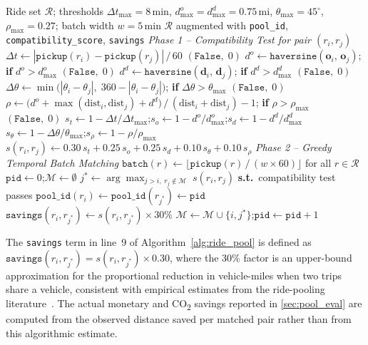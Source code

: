 \documentclass[a4paper,fleqn]{cas-dc}
\begin{document}
\begin{algorithm}[H]
\caption{Multi-Criteria Ride Pooling (Compatibility Test and Greedy Matching)}
\label{alg:ride_pool}
\begin{algorithmic}[1]
\Require Ride set $\mathcal{R}$; thresholds $\Delta t_{\max}{=}8$\,min, $d^o_{\max}{=}d^d_{\max}{=}0.75$\,mi, $\theta_{\max}{=}45^\circ$, $\rho_{\max}{=}0.27$; batch width $w{=}5$\,min
\Ensure $\mathcal{R}$ augmented with \texttt{pool\_id}, \texttt{compatibility\_score}, \texttt{savings}
\Statex \textit{Phase 1 -- Compatibility Test for pair $(r_i, r_j)$}
\State $\Delta t \gets |\texttt{pickup}(r_i) - \texttt{pickup}(r_j)|\,/\,60$
 \Return $(\mathtt{False},\;0)$ \EndIf
\State $d^o \gets \texttt{haversine}(\mathbf{o}_i,\,\mathbf{o}_j)$; \textbf{if} $d^o > d^o_{\max}$ \Return $(\mathtt{False},\;0)$
\State $d^d \gets \texttt{haversine}(\mathbf{d}_i,\,\mathbf{d}_j)$; \textbf{if} $d^d > d^d_{\max}$ \Return $(\mathtt{False},\;0)$
\State $\Delta\theta \gets \min\bigl(|\theta_i-\theta_j|,\;360-|\theta_i-\theta_j|\bigr)$; \textbf{if} $\Delta\theta > \theta_{\max}$ \Return $(\mathtt{False},\;0)$
\State $\rho \gets \bigl(d^o + \max(\mathrm{dist}_i, \mathrm{dist}_j) + d^d\bigr)\,/\,(\mathrm{dist}_i + \mathrm{dist}_j) - 1$; \textbf{if} $\rho > \rho_{\max}$ \Return $(\mathtt{False},\;0)$
\State $s_t \gets 1-\Delta t/\Delta t_{\max}$;\enspace $s_o \gets 1-d^o/d^o_{\max}$;\enspace $s_d \gets 1-d^d/d^d_{\max}$
\State $s_\theta \gets 1-\Delta\theta/\theta_{\max}$;\enspace $s_\rho \gets 1-\rho/\rho_{\max}$
\State $s(r_i,r_j) \gets 0.30\,s_t + 0.25\,s_o + 0.25\,s_d + 0.10\,s_\theta + 0.10\,s_\rho$
\Statex \textit{Phase 2 -- Greedy Temporal Batch Matching}
\State $\texttt{batch}(r) \gets \lfloor\texttt{pickup}(r)\,/\,(w\!\times\!60)\rfloor$ \; for all $r\in\mathcal{R}$
\State $\texttt{pid} \gets 0$;\quad $\mathcal{M} \gets \emptyset$
    \State $j^* \gets \arg\max_{j>i,\;r_j\notin\mathcal{M}}\;s(r_i,r_j)$ \textbf{s.t.}\ compatibility test passes
      \State $\texttt{pool\_id}(r_i)\gets\texttt{pool\_id}(r_{j^*})\gets\texttt{pid}$
      \State $\texttt{savings}(r_i,r_{j^*})\gets s(r_i,r_{j^*})\times 30\%$
      \State $\mathcal{M}\gets\mathcal{M}\cup\{i,j^*\}$;\quad $\texttt{pid}\gets\texttt{pid}+1$
    \EndIf
  \EndFor
\EndFor
\end{algorithmic}
\end{algorithm}

The \texttt{savings} term in line~9 of Algorithm~\ref{alg:ride_pool} is defined as $\texttt{savings}(r_i, r_{j^*}) = s(r_i, r_{j^*}) \times 0.30$, where the 30\% factor is an upper-bound approximation for the proportional reduction in vehicle-miles when two trips share a vehicle, consistent with empirical estimates from the ride-pooling literature~\cite{santi2014quantifying}.  The actual monetary and CO\textsubscript{2} savings reported in \autoref{sec:pool_eval} are computed from the observed distance saved per matched pair rather than from this algorithmic estimate.
\end{document}

